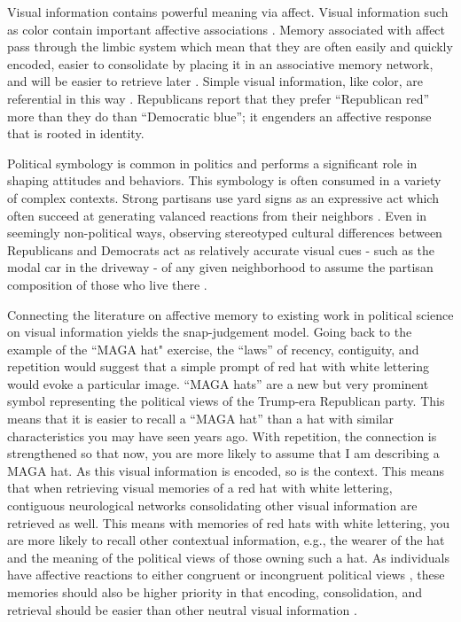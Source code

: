 \documentclass [12pt]{article}
\begin{document}
Visual information contains powerful meaning via affect. Visual information such as color contain important affective associations \citep{cimbalo_et-al_1978_jgp}. Memory associated with affect pass through the limbic system which mean that they are often easily and quickly encoded, easier to consolidate by placing it in an associative memory network, and will be easier to retrieve later \citep{kensinger_fields_2022_ohhum}. Simple visual information, like color, are referential in this way \citep{elliot_maier_2012_aesp}. Republicans report that they prefer ``Republican red'' more than they do than ``Democratic blue''; it engenders an affective response that is rooted in identity.

Political symbology is common in politics and performs a significant role in shaping attitudes and behaviors. This symbology is often consumed in a variety of complex contexts. Strong partisans use yard signs as an expressive act which often succeed at generating valanced reactions from their neighbors \citep{makse_et-al_2019_oup}. Even in seemingly non-political ways, observing stereotyped cultural differences between Republicans and Democrats act as relatively accurate visual cues - such as the modal car in the driveway - of any given neighborhood to assume the partisan composition of those who live there \citep{hetherington_weiler_2018_hmh}.

Connecting the literature on affective memory to existing work in political science on visual information yields the snap-judgement model. Going back to the example of the ``MAGA hat" exercise, the ``laws'' of recency, contiguity, and repetition \citep{kahana_et-al_2022_ohhum} would suggest that a simple prompt of red hat with white lettering would evoke a particular image. ``MAGA hats'' are a new but very prominent symbol representing the political views of the Trump-era Republican party. This means that it is easier to recall a ``MAGA hat'' than a hat with similar characteristics you may have seen years ago. With repetition, the connection is strengthened so that now, you are more likely to assume that I am describing a MAGA hat. As this visual information is encoded, so is the context. This means that when retrieving visual memories of a red hat with white lettering, contiguous neurological networks consolidating other visual information are retrieved as well. This means with memories of red hats with white lettering, you are more likely to recall other contextual information, e.g., the wearer of the hat and the meaning of the political views of those owning such a hat. As individuals have affective reactions to either congruent or incongruent political views \citep{iyengar_westwood_2015, druckman_levendusky_2019}, these memories should also be higher priority in that encoding, consolidation, and retrieval should be easier than other neutral visual information \citep{kensinger_fields_2022_ohhum}. 
\end{document}
